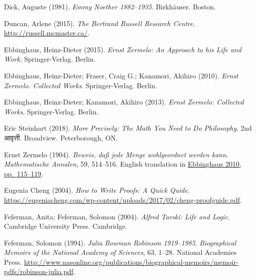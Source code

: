 \par\medskip{}\label{bib:Dick1981}
Dick, Auguste (1981). \emph{Emmy {N}oether 1882--1935}. Birkh\"auser. Boston.

\par\medskip{}\label{bib:Duncan2015}
Duncan, Arlene (2015). \emph{The {B}ertrand {R}ussell {R}esearch {C}entre}. \url{http://russell.mcmaster.ca/}.

\par\medskip{}\label{bib:Ebbinghaus2015}
Ebbinghaus, Heinz-Dieter (2015). \emph{Ernst {Z}ermelo: {A}n {A}pproach to his {L}ife and {W}ork}. Springer-Verlag. Berlin.

\par\medskip{}\label{bib:Ebbinghaus2010}
Ebbinghaus, Heinz-Dieter; Fraser, Craig G.; Kanamori, Akihiro (2010). \emph{Ernst Zermelo. Collected Works}. Springer-Verlag. Berlin.

\par\medskip{}\label{bib:Ebbinghaus2013}
Ebbinghaus, Heinz-Dieter; Kanamori, Akihiro (2013). \emph{Ernst Zermelo: Collected Works}. Springer-Verlag. Berlin.

\par\medskip{}\label{bib:Steinhart2018}
Eric Steinhart (2018). \emph{More Precisely: The Math You Need to Do Philosophy}. 2nd आवृत्ती. Broadview. Peterborough, ON.

\par\medskip{}\label{bib:Zermelo1904}
Ernst Zermelo (1904). \emph{Beweis, da{\ss} jede {M}enge wohlgeordnet werden kann}. \emph{Mathe\-ma\-tische An\-nalen}, 59, 514--516. {E}nglish translation in \hyperref[bib:Ebbinghaus2010]{Ebbinghaus 2010, pp.~115--119}.

\par\medskip{}\label{bib:Cheng2004}
Eugenia Cheng (2004). \emph{How to Write Proofs: A Quick Quide}. \url{https://eugeniacheng.com/wp-content/uploads/2017/02/cheng-proofguide.pdf}.

\par\medskip{}\label{bib:Feferman2004}
Feferman, Anita; Feferman, Solomon (2004). \emph{Alfred Tarski: Life and Logic}. Cambridge University Press. Cambridge.

\par\medskip{}\label{bib:Feferman1994}
Feferman, Solomon (1994). \emph{{J}ulia {B}owman {R}obinson 1919--1985}. \emph{Biographical Memoirs of the National Academy of Sciences}, 63, 1--28. National Academies Press. \url{http://www.nasonline.org/publications/biographical-memoirs/memoir-pdfs/robinson-julia.pdf}.

